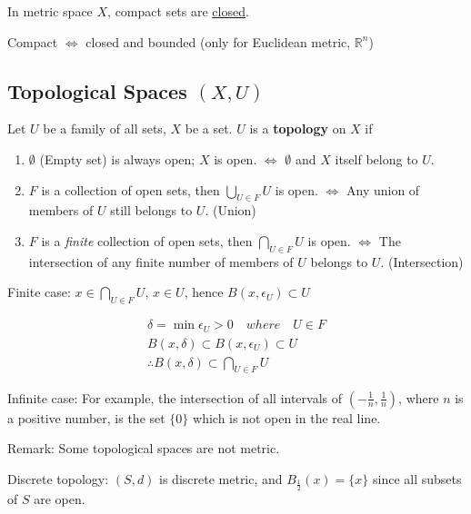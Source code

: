 \documentclass{article}
\begin{document}
        In metric space $X$, compact sets are \underline{closed}.
    
        Compact $\Leftrightarrow$ closed and bounded (only for Euclidean metric, $\mathbb{R}^{n}$)
    
        \subsection{Topological Spaces $(X, U)$}

        Let $U$ be a family of all sets, $X$ be a set. $U$ is a \textbf{topology} on $X$ if

        \begin{enumerate}
            \item $\emptyset$ (Empty set) is always open; $X$ is open. $\Leftrightarrow$ $\emptyset$ and $X$ itself belong to $U$.
            \item $F$ is a collection of open sets, then $\bigcup_{U \in F} U$ is open. $\Leftrightarrow$ Any union of members of $U$ still belongs to $U$. (Union)
            \item $F$ is a \textit{finite} collection of open sets, then $\bigcap_{U \in F} U$ is open. $\Leftrightarrow$ The intersection of any finite number of members of $U$ belongs to $U$. (Intersection)
        \end{enumerate}

        Finite case: $x \in \bigcap_{U \in F} U$, $x \in U$, hence $B(x, \epsilon_{U}) \subset U$

        \begin{gather*}
            \delta = \min \epsilon_{U} > 0 \quad where \quad U \in F \\
            B(x, \delta) \subset B(x, \epsilon_{U}) \subset U \\
            \therefore B(x, \delta) \subset \bigcap_{U \in F} U
        \end{gather*}

        Infinite case: For example, the intersection of all intervals of $( -\frac{1}{n}, \frac{1}{n})$, where $n$ is a positive number, is the set $\{ 0 \}$ which is not open in the real line.
        
        Remark: Some topological spaces are not metric.
        
        Discrete topology: $(S, d)$ is discrete metric, and $B_{\frac{1}{2}} (x) = \{ x \}$ since all subsets of $S$ are open.
\end{document}
